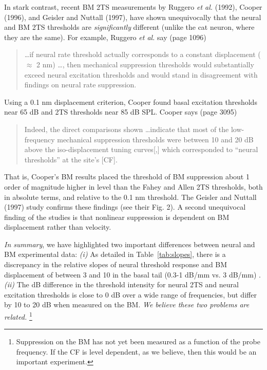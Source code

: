 \documentclass{ws-p8-50x6-00}
\newcommand{\Tab}[1]{Table~\ref{tab:#1}}
\begin{document}
In stark contrast, recent BM 2TS measurements by
 Ruggero \emph{et al.} (1992), \nocite{Ruggero92a}
 Cooper (1996), \nocite{Cooper96b} and
 Geisler and Nuttall (1997), \nocite{Geisler97a}
have shown unequivocally that the neural and BM 2TS thresholds are
\emph{significantly} different (unlike the cat neuron, where they
are the same). For example, Ruggero \emph{et al.} say (page 1096)
	\begin{quote}
\ldots if neural
rate threshold actually corresponds to a constant displacement ($\approx$ 2 nm)
\ldots, then mechanical suppression thresholds would substantially exceed neural
excitation thresholds and would stand in disagreement with findings on neural
rate suppression.
	\end{quote}
Using a 0.1 nm displacement criterion, Cooper found basal excitation
thresholds near 65 dB and 2TS thresholds near 85 dB SPL. 
Cooper says (page 3095)
	\begin{quote}
Indeed, the direct comparisons shown \ldots indicate that most of
the low-frequency mechanical suppression thresholds were between 10 and
20 dB above the iso-displacement tuning curves[,] which corresponded to
``neural thresholds'' at the site's [CF].
	\end{quote}
That is, Cooper's BM results placed the threshold of BM suppression about 1
order of magnitude higher in level than the Fahey and Allen 2TS thresholds,
both in absolute terms, and relative to the 0.1 nm threshold.
The Geisler and Nuttall (1997) study confirms these findings (see their Fig. 2).
A second unequivocal finding of the studies \cite{Cooper96b,Geisler97a} is
that nonlinear suppression is dependent on BM displacement rather than
velocity.

\emph{In summary}, we have highlighted two important differences between
neural and BM experimental data:
	{\it (i)}
As detailed in \Tab{slopes}, there is a discrepancy in the relative slopes
of neural threshold response and BM displacement of between 3 and 10 in the
basal tail (0.3-1 dB/mm vs. 3 dB/mm) \cite{Allen99d}.
	{\it (ii)}
The dB difference in the threshold intensity for neural 2TS and neural excitation
thresholds is close to 0 dB over a wide range of frequencies, but differ by
10 to 20 dB when measured on the BM.
\emph{ We believe these two problems are related.}%
	\footnote{ \setlength{\baselineskip}{0.1em}
	Suppression on the BM has not yet been measured as a function of
	the probe frequency. If the CF is level dependent, as we believe, then this
	would be an important experiment.
	}
\end{document}
